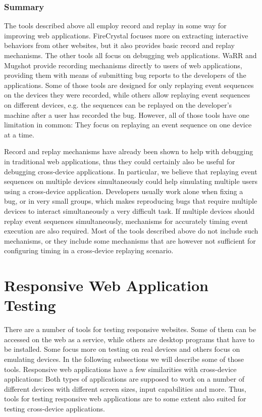 \subsubsection{Summary}

The tools described above all employ record and replay in some way for improving web applications. FireCrystal focuses more on extracting interactive behaviors from other websites, but it also provides basic record and replay mechanisms. The other tools all focus on debugging web applications. WaRR and Mugshot provide recording mechanisms directly to users of web applications, providing them with means of submitting bug reports to the developers of the applications. Some of those tools are designed for only replaying event sequences on the devices they were recorded, while others allow replaying event sequences on different devices, e.g. the sequences can be replayed on the developer's machine after a user has recorded the bug. However, all of those tools have one limitation in common: They focus on replaying an event sequence on one device at a time. 

Record and replay mechanisms have already been shown to help with debugging in traditional web applications, thus they could certainly also be useful for debugging cross-device applications. In particular, we believe that replaying event sequences on multiple devices simultaneously could help simulating multiple users using a cross-device application. Developers usually work alone when fixing a bug, or in very small groups, which makes reproducing bugs that require multiple devices to interact simultaneously a very difficult task. If multiple devices should replay event sequences simultaneously, mechanisms for accurately timing event execution are also required. Most of the tools described above do not include such mechanisms, or they include some mechanisms that are however not sufficient for configuring timing in a cross-device replaying scenario.

\section{Responsive Web Application Testing}

There are a number of tools for testing responsive websites. Some of them can be accessed on the web as a service, while others are desktop programs that have to be installed. Some focus more on testing on real devices and others focus on emulating devices. In the following subsections we will describe some of those tools. Responsive web applications have a few similarities with cross-device applications: Both types of applications are supposed to work on a number of different devices with different screen sizes, input capabilities and more. Thus, tools for testing responsive web applications are to some extent also suited for testing cross-device applications.

